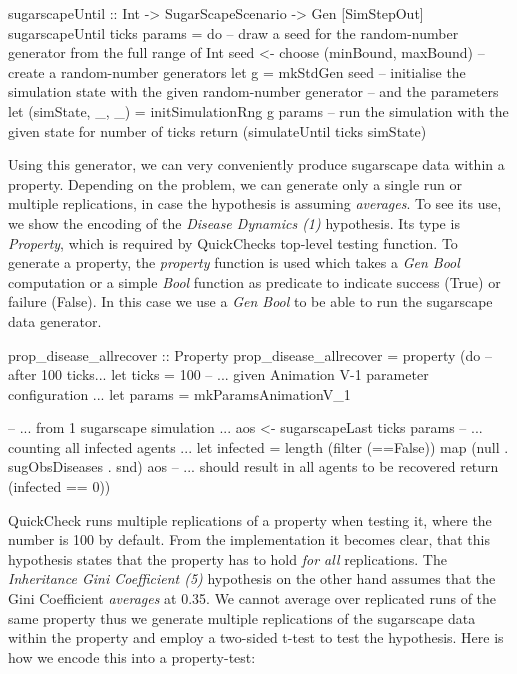 \begin{HaskellCode}
sugarscapeUntil :: Int -> SugarScapeScenario -> Gen [SimStepOut]
sugarscapeUntil ticks params = do
  -- draw a seed for the random-number generator from the full range of Int
  seed <- choose (minBound, maxBound)
  -- create a random-number generators
  let g = mkStdGen seed
  -- initialise the simulation state with the given random-number generator
  -- and the parameters
  let (simState, _, _) = initSimulationRng g params
  -- run the simulation with the given state for number of ticks
  return (simulateUntil ticks simState)
\end{HaskellCode}

Using this generator, we can very conveniently produce sugarscape data within a property. Depending on the problem, we can generate only a single run or multiple replications, in case the hypothesis is assuming \textit{averages}. To see its use, we show the encoding of the \textit{Disease Dynamics (1)} hypothesis. Its type is \textit{Property}, which is required by QuickChecks top-level testing function. To generate a property, the \textit{property} function is used which takes a \textit{Gen Bool} computation or a simple \textit{Bool} function as predicate to indicate success (True) or failure (False). In this case we use a \textit{Gen Bool} to be able to run the sugarscape data generator.

\begin{HaskellCode}
prop_disease_allrecover :: Property
prop_disease_allrecover = property (do
  -- after 100 ticks...
  let ticks  = 100
  -- ... given Animation V-1 parameter configuration ...
  let params = mkParamsAnimationV_1

  -- ... from 1 sugarscape simulation ...
  aos <- sugarscapeLast ticks params
  -- ... counting all infected agents ...
  let infected = length (filter (==False)) map (null . sugObsDiseases . snd) aos
  -- ... should result in all agents to be recovered
  return (infected == 0))
\end{HaskellCode}

QuickCheck runs multiple replications of a property when testing it, where the number is 100 by default. From the implementation it becomes clear, that this hypothesis states that the property has to hold \textit{for all} replications. The \textit{Inheritance Gini Coefficient (5)} hypothesis on the other hand assumes that the Gini Coefficient \textit{averages} at 0.35. We cannot average over replicated runs of the same property thus we generate multiple replications of the sugarscape data within the property and employ a two-sided t-test to test the hypothesis. Here is how we encode this into a property-test:

